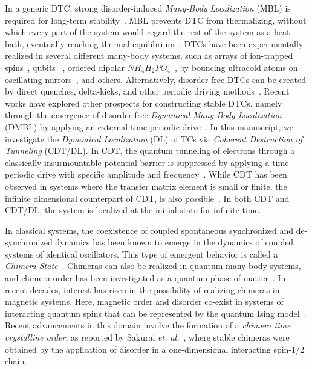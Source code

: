 \documentclass[%
nofootinbib,
reprint,
superscriptaddress,
amsmath,amssymb,showkeys,
aps,
prb,
]{revtex4-2}
\begin{document}
	In a generic DTC, strong disorder-induced \textit{Many-Body Localization} (MBL) is required for long-term stability~\cite{zhang_observation_2017}. MBL prevents DTC from thermalizing, without which every part of the system
	would regard the rest of the system as a heat-bath, eventually reaching thermal equilibrium~\cite{alet_many-body_2018,else_floquet_2016,smith_many-body_2016,nguyen_signature_2021}.  DTCs have been experimentally realized in several different many-body systems, such as arrays of ion-trapped spins~\cite{huang2018,taheri_all-optical_2022, Soham2018, zhang_observation_2017, yao_time_2018}, qubits ~\cite{frey_realization_2022}, ordered dipolar $NH_4H_2PO_4$~\cite{rovny_observation_2018}, by bouncing ultracold atoms on oscillating mirrors~\cite{sacha_time_nodate,golletz_basis_2022}, and others. Alternatively, disorder-free DTCs can be created by direct quenches, delta-kicks, and other periodic driving methods~\cite{else_prethermal_2017, russomanno_spin_2017, ho_critical_2017, yu2019, russomanno_floquet_2017}.  Recent works have explored other prospects for constructing stable DTCs, namely through the emergence of disorder-free \textit{Dynamical Many-Body Localization} (DMBL)  by applying an external time-periodic drive~\cite{Keser2016, haldar_dynamical_2017, haldar_dynamical_2021,bhattacharyya_transverse_2012,aditya2023dynamical,dutta2014,das_exotic_2010}. In this manuscript, we investigate the \textit{Dynamical Localization} (DL) of TCs via \textit{Coherent Destruction of Tunneling} (CDT/DL). In CDT, the quantum tunneling of electrons through a classically insurmountable potential barrier is suppressed by applying a time-periodic drive with specific amplitude and frequency~\cite{Grossmann1991, Ashhab2007}. While CDT has been observed in systems where the transfer matrix element is small or finite,  the infinite dimensional counterpart of CDT, is also possible~\cite{das_exotic_2010, Roy2015}. In both CDT and CDT/DL, the system is localized at the initial state for infinite time\cite{Kayanuma2008}.
	
	In classical systems, the coexistence of coupled spontaneous synchronized and de-synchronized  dynamics has been known to emerge in the dynamics of coupled systems of identical oscillators. This type of emergent behavior is called a \textit{Chimera State}~\cite{kuramoto_coexistence_2002, panaggio_chimera_2015, parastesh_chimeras_2021}. Chimeras can also be realized in quantum many body systems, and chimera order has been investigated as a quantum phase of matter~\cite{bastidas_quantum_2015}. In recent decades, interest has risen in the possibility of realizing chimeras in magnetic systems. Here, magnetic order and disorder co-exist in systems of interacting quantum spins that can be represented by the quantum Ising model~\cite{singh_chimera_2011}.  Recent advancements in this domain involve the formation of a \textit{chimera time crystalline order}, as reported by Sakurai \textit{et. al.}~\cite{sakurai_phys_nodate}, where stable chimeras were obtained by the application of disorder in a one-dimensional interacting spin-1/2 chain.
	
\end{document}
